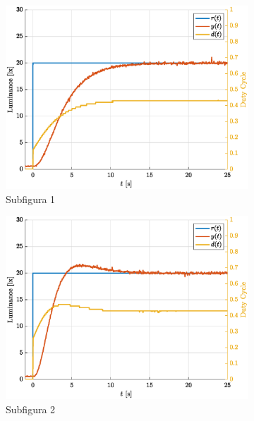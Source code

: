 \documentclass[12pt]{article}
\begin{document}
\begin{figure}[H]
    \centering
    \begin{subfigure}{0.33\textwidth}
        \includegraphics[width=\linewidth]{Imagens/Subimage1.eps}
        \caption{Subfigura 1}
        \label{fig:2.1}
    \end{subfigure}%
    \begin{subfigure}{0.33\textwidth}
        \includegraphics[width=\linewidth]{Imagens/Subimage2.eps}
        \caption{Subfigura 2}
        \label{fig:2.2}
    \end{subfigure}%
    \begin{subfigure}{0.33\textwidth}

\end{subfigure}
\end{figure}
\end{document}
